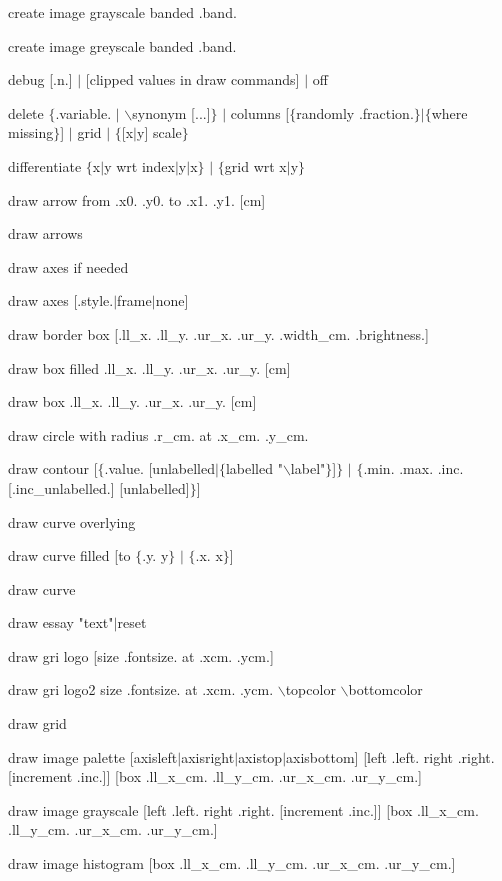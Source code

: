 create image grayscale banded .band.

create image greyscale banded .band.

debug [.n.] $\mid$ [clipped values in draw commands] $\mid$ off

delete $\lbrace$.variable. $\mid$ $\backslash$synonym [...]$\rbrace$ $\mid$ columns [$\lbrace$randomly .fraction.$\rbrace$$\mid$$\lbrace$where missing$\rbrace$] $\mid$ grid $\mid$ $\lbrace$[x$\mid$y] scale$\rbrace$

differentiate $\lbrace$x$\mid$y wrt index$\mid$y$\mid$x$\rbrace$ $\mid$ $\lbrace$grid wrt x$\mid$y$\rbrace$

draw arrow from .x0. .y0. to .x1. .y1. [cm]

draw arrows

draw axes if needed

draw axes [.style.$\mid$frame$\mid$none]

draw border box [.ll\_x. .ll\_y. .ur\_x. .ur\_y. .width\_cm. .brightness.]

draw box filled .ll\_x. .ll\_y. .ur\_x. .ur\_y. [cm]

draw box .ll\_x. .ll\_y. .ur\_x. .ur\_y. [cm]

draw circle with radius .r\_cm. at .x\_cm. .y\_cm.

draw contour [$\lbrace$.value. [unlabelled$\mid$$\lbrace$labelled "$\backslash$label"$\rbrace$]$\rbrace$ $\mid$ $\lbrace$.min. .max. .inc. [.inc\_unlabelled.] [unlabelled]$\rbrace$]

draw curve overlying

draw curve filled [to $\lbrace$.y. y$\rbrace$ $\mid$ $\lbrace$.x. x$\rbrace$]

draw curve

draw essay "text"$\mid$reset

draw gri logo [size .fontsize. at .xcm. .ycm.]

draw gri logo2 size .fontsize. at .xcm. .ycm. $\backslash$topcolor $\backslash$bottomcolor

draw grid

draw image palette [axisleft$\mid$axisright$\mid$axistop$\mid$axisbottom] [left .left. right .right. [increment .inc.]] [box .ll\_x\_cm. .ll\_y\_cm. .ur\_x\_cm. .ur\_y\_cm.]

draw image grayscale [left .left. right .right. [increment .inc.]] [box .ll\_x\_cm. .ll\_y\_cm. .ur\_x\_cm. .ur\_y\_cm.]

draw image histogram [box .ll\_x\_cm. .ll\_y\_cm. .ur\_x\_cm. .ur\_y\_cm.]


